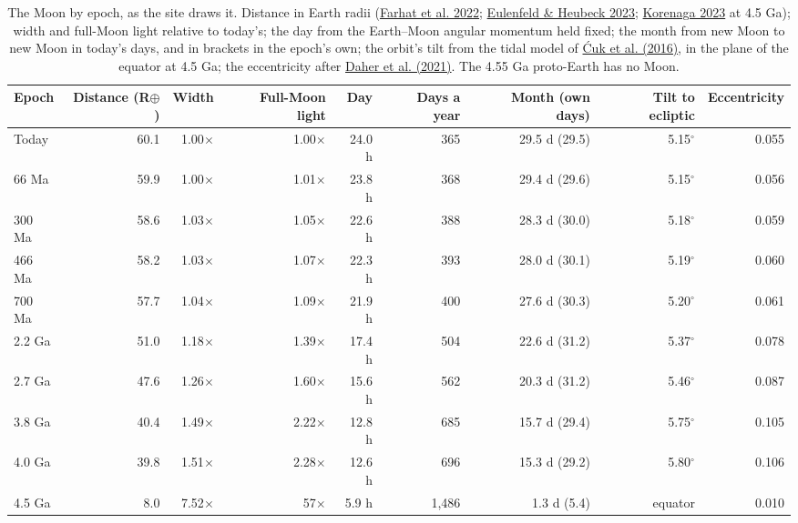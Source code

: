 \documentclass[9pt,twocolumn]{extarticle}
\begin{document}
\begin{table}[tp]\centering\footnotesize
\caption{The Moon by epoch, as the site draws it. Distance in Earth radii (\protect\hyperlink{cite.farhat2022}{Farhat et al. 2022}; \protect\hyperlink{cite.eulenfeld2023}{Eulenfeld \& Heubeck 2023}; \protect\hyperlink{cite.korenaga2023}{Korenaga 2023} at 4.5 Ga); width and full-Moon light relative to today's; the day from the Earth--Moon angular momentum held fixed; the month from new Moon to new Moon in today's days, and in brackets in the epoch's own; the orbit's tilt from the tidal model of \protect\hyperlink{cite.cuk2016}{Ćuk et al. (2016)}, in the plane of the equator at 4.5 Ga; the eccentricity after \protect\hyperlink{cite.daher2021}{Daher et al. (2021)}. The 4.55 Ga proto-Earth has no Moon.}\label{tab:moon}
\begin{tabularx}{\textwidth}{@{}lrrrrrrrr@{}}\toprule
Epoch & Distance (R$\oplus$) & Width & Full-Moon light & Day & Days a year & Month (own days) & Tilt to ecliptic & Eccentricity \\ \midrule
Today & 60.1 & 1.00$\times$ & 1.00$\times$ & 24.0 h & 365 & 29.5 d (29.5) & 5.15$^\circ$ & 0.055 \\
66 Ma & 59.9 & 1.00$\times$ & 1.01$\times$ & 23.8 h & 368 & 29.4 d (29.6) & 5.15$^\circ$ & 0.056 \\
300 Ma & 58.6 & 1.03$\times$ & 1.05$\times$ & 22.6 h & 388 & 28.3 d (30.0) & 5.18$^\circ$ & 0.059 \\
466 Ma & 58.2 & 1.03$\times$ & 1.07$\times$ & 22.3 h & 393 & 28.0 d (30.1) & 5.19$^\circ$ & 0.060 \\
700 Ma & 57.7 & 1.04$\times$ & 1.09$\times$ & 21.9 h & 400 & 27.6 d (30.3) & 5.20$^\circ$ & 0.061 \\
2.2 Ga & 51.0 & 1.18$\times$ & 1.39$\times$ & 17.4 h & 504 & 22.6 d (31.2) & 5.37$^\circ$ & 0.078 \\
2.7 Ga & 47.6 & 1.26$\times$ & 1.60$\times$ & 15.6 h & 562 & 20.3 d (31.2) & 5.46$^\circ$ & 0.087 \\
3.8 Ga & 40.4 & 1.49$\times$ & 2.22$\times$ & 12.8 h & 685 & 15.7 d (29.4) & 5.75$^\circ$ & 0.105 \\
4.0 Ga & 39.8 & 1.51$\times$ & 2.28$\times$ & 12.6 h & 696 & 15.3 d (29.2) & 5.80$^\circ$ & 0.106 \\
4.5 Ga & 8.0 & 7.52$\times$ & 57$\times$ & 5.9 h & 1,486 & 1.3 d (5.4) & equator & 0.010 \\
\bottomrule\end{tabularx}
\end{table}
\end{document}
